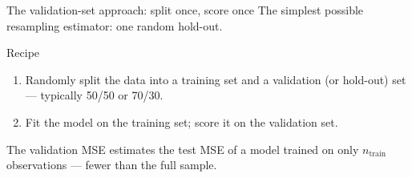 \documentclass[aspectratio=169,11pt]{beamer}
\begin{document}
\begin{frame}{The validation-set approach: split once, score once}
  The simplest possible resampling estimator: one random hold-out.
  \begin{center}
  \end{center}
  \begin{block}{Recipe}
    \begin{enumerate}
      \item Randomly split the data into a training set and a
            validation (or hold-out) set --- typically 50/50 or 70/30.
      \item Fit the model on the training set; score it on the
            validation set.
    \end{enumerate}
  \end{block}
  \begin{readme}
    The validation MSE estimates the test MSE of a model trained on
    only $n_\mathrm{train}$ observations --- fewer than the full sample.
  \end{readme}
\end{frame}
\end{document}
